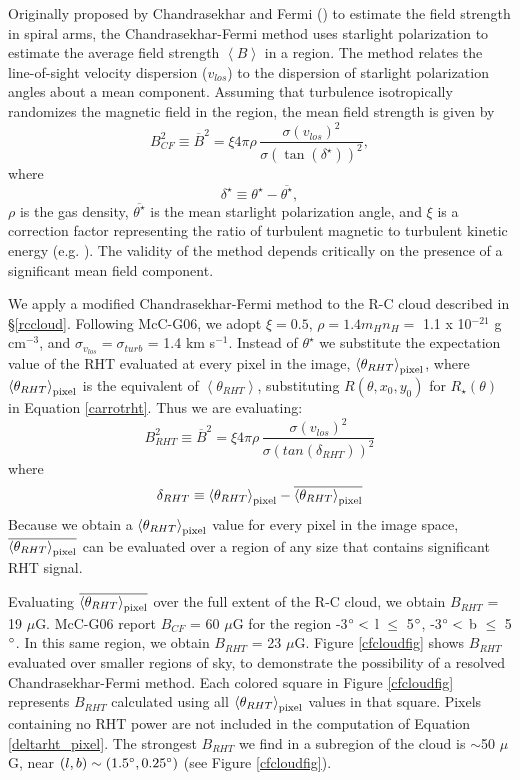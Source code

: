 \documentclass[12pt]{emulateapj}
\newcommand{\beq}{\begin{equation}}
\newcommand{\eeq}{\end{equation}}
\newcommand{\citei}[1]{\citeauthor{#1} \citeyear{#1}}
\begin{document}
Originally proposed by Chandrasekhar and Fermi (\citeyear{CHANDRASEKHAR:1953uq}) to estimate the field strength in spiral arms, the Chandrasekhar-Fermi method uses starlight polarization to estimate the average field strength ${\left< B \right>}$ in a region. The method relates the line-of-sight velocity dispersion (${v_{los}}$) to the dispersion of starlight polarization angles about a mean component. Assuming that turbulence isotropically randomizes the magnetic field in the region, the mean field strength is given by
\beq
B_{CF}^2 \equiv \overline{B}^2 = \xi 4\pi\rho \, \frac{\sigma(v_{los})^2}{\sigma(\tan (\delta^\star))^2},
\eeq
where
\beq
\delta^\star \equiv \theta^\star - \overline{\theta^\star },
\eeq
${\rho}$ is the gas density,  $\overline{\theta^\star }$ is the mean starlight polarization angle, and ${\xi}$ is a correction factor representing the ratio of turbulent magnetic to turbulent kinetic energy (e.g. \citei{Heitsch:2001da}). The validity of the method depends critically on the presence of a significant mean field component.

We apply a modified Chandrasekhar-Fermi method to the R-C cloud described in \S\ref{rccloud}. Following McC-G06, we adopt ${\xi = 0.5}$, ${\rho = 1.4m_Hn_H =}$ 1.1 x 10${^{-21}}$ g cm${^{-3}}$, and ${\sigma_{v_{los}} = \sigma_{turb}}$ = 1.4 km s${^{-1}}$. Instead of $\theta^\star$ we substitute the expectation value of the RHT evaluated at every pixel in the image, ${\left<\theta_{RHT}\right>}_{\rm pixel}$, where ${\left<\theta_{RHT}\right>}_{\rm pixel}$ is the equivalent of  ${\left<\theta_{RHT}\right>}$, substituting $R\left(\theta, x_0, y_0\right)$ for $R_\star\left(\theta\right)$ in Equation \ref{carrotrht}. Thus we are evaluating:
\beq
B_{RHT}^2 \equiv \overline{B}^2 = \xi 4\pi\rho \, \frac{\sigma(v_{los})^2}{\sigma(tan (\delta_{RHT}))^2}
\eeq
where
\beq\label{deltarht_pixel}
\delta_{RHT} \equiv \left<\theta_{RHT}\right>_{\rm pixel} - \overline{\left<\theta_{RHT}\right>_{\rm pixel}}
\eeq
Because we obtain a ${\left<\theta_{RHT}\right>_{\rm pixel}}$ value for every pixel in the image space, ${\overline{\left<\theta_{RHT}\right>_{\rm pixel}}}$ can be evaluated over a region of any size that contains significant RHT signal.

Evaluating ${\overline{\left<\theta_{RHT}\right>_{\rm pixel}}}$ over the full extent of the R-C cloud, we obtain ${B_{RHT}}$ = 19 ${\mu}$G. McC-G06 report ${B_{CF}}$ = 60 ${\mu}$G for the region -3${\degree <}$ l ${\le}$ 5${\degree}$,  -3${\degree <}$ b ${\le}$ 5${\degree}$. In this same region, we obtain ${B_{RHT}}$ = 23 ${\mu}$G. Figure \ref{cfcloudfig} shows ${B_{RHT}}$ evaluated over smaller regions of sky, to demonstrate the possibility of a resolved Chandrasekhar-Fermi method. Each colored square in Figure \ref{cfcloudfig} represents $B_{RHT}$ calculated using all ${\left<\theta_{RHT}\right>_{\rm pixel}}$ values in that square. Pixels containing no RHT power are not included in the computation of Equation \ref{deltarht_pixel}. The strongest ${B_{RHT}}$ we find in a subregion of the cloud is ${\sim}$50 ${\mu}$G, near $(l, b) \sim (1.5\degree, 0.25\degree)$ (see Figure \ref{cfcloudfig}).
\end{document}
